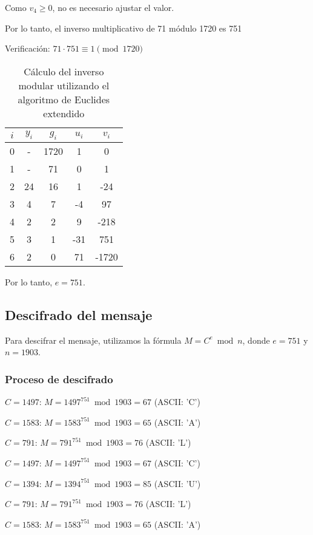 Como $v_4 \geq 0$, no es necesario ajustar el valor.

Por lo tanto, el inverso multiplicativo de 71 módulo 1720 es 751

Verificación: $71 \cdot 751 \equiv 1 \pmod{1720}$

\begin{table}[h]
\centering
\begin{tabular}{|c|c|c|c|c|}
\hline
$i$ & $y_i$ & $g_i$ & $u_i$ & $v_i$ \\ \hline
0 & - & 1720 & 1 & 0 \\ \hline
1 & - & 71 & 0 & 1 \\ \hline
2 & 24 & 16 & 1 & -24 \\ \hline
3 & 4 & 7 & -4 & 97 \\ \hline
4 & 2 & 2 & 9 & -218 \\ \hline
5 & 3 & 1 & -31 & 751 \\ \hline
6 & 2 & 0 & 71 & -1720 \\ \hline
\end{tabular}
\caption{Cálculo del inverso modular utilizando el algoritmo de Euclides extendido}
\label{tab:euclides}
\end{table}

Por lo tanto, $e = 751$.

\subsection{Descifrado del mensaje}

Para descifrar el mensaje, utilizamos la fórmula $M = C^e \bmod n$, donde $e = 751$ y $n = 1903$.

\subsubsection{Proceso de descifrado}

$C = 1497$: $M = 1497^{751} \bmod 1903 = 67$ (ASCII: 'C')

$C = 1583$: $M = 1583^{751} \bmod 1903 = 65$ (ASCII: 'A')

$C = 791$: $M = 791^{751} \bmod 1903 = 76$ (ASCII: 'L')

$C = 1497$: $M = 1497^{751} \bmod 1903 = 67$ (ASCII: 'C')

$C = 1394$: $M = 1394^{751} \bmod 1903 = 85$ (ASCII: 'U')

$C = 791$: $M = 791^{751} \bmod 1903 = 76$ (ASCII: 'L')

$C = 1583$: $M = 1583^{751} \bmod 1903 = 65$ (ASCII: 'A')

